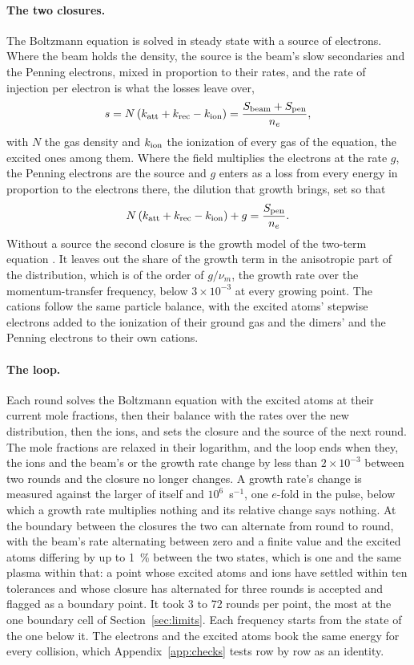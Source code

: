 \documentclass[11pt]{article}
\begin{document}
\paragraph{The two closures.}
The Boltzmann equation is solved in steady state with a source of electrons. Where the beam holds the density, the
source is the beam's slow secondaries and the Penning electrons, mixed in proportion to their rates, and the rate
of injection per electron is what the losses leave over,
\begin{equation}
s=N\left(k_{\rm att}+k_{\rm rec}-k_{\rm ion}\right)=\frac{S_{\rm beam}+S_{\rm pen}}{n_e},
\label{eq:held}
\end{equation}
with $N$ the gas density and $k_{\rm ion}$ the ionization of every gas of the equation, the excited ones among
them. Where the field multiplies the electrons at the rate $g$, the Penning electrons are the source and $g$ enters
as a loss from every energy in proportion to the electrons there, the dilution that growth brings, set so that
\begin{equation}
N\left(k_{\rm att}+k_{\rm rec}-k_{\rm ion}\right)+g=\frac{S_{\rm pen}}{n_e}.
\label{eq:grow}
\end{equation}
Without a source the second closure is the growth model of the two-term equation \cite{HP2005}. It leaves out the
share of the growth term in the anisotropic part of the distribution, which is of the order of $g/\nu_m$, the
growth rate over the momentum-transfer frequency, below $3\times10^{-3}$ at every growing point. The cations
follow the same particle balance, with the excited atoms' stepwise electrons added to the ionization of their
ground gas and the dimers' and the Penning electrons to their own cations.

\paragraph{The loop.}
Each round solves the Boltzmann equation with the excited atoms at their current mole fractions, then their
balance with the rates over the new distribution, then the ions, and sets the closure and the source of the next
round. The mole fractions are relaxed in their logarithm, and the loop ends when they, the ions and the beam's or
the growth rate change by less than $2\times10^{-3}$ between two rounds and the closure no longer changes. A
growth rate's change is measured against the larger of itself and $10^6$~s$^{-1}$, one $e$-fold in the pulse,
below which a growth rate multiplies nothing and its relative change says nothing. At the boundary between the
closures the two can alternate from round to round, with the beam's rate alternating between zero and a finite
value and the excited atoms differing by up to 1~\% between the two states, which is one and the same plasma within
that: a point whose excited atoms and ions have settled within ten tolerances and whose closure has alternated
for three rounds is accepted and flagged as a boundary point. It took 3 to 72 rounds per point, the most at the
one boundary cell of Section~\ref{sec:limits}. Each frequency starts from the state of the one below it. The
electrons and the excited atoms book the same energy for every collision, which Appendix~\ref{app:checks} tests
row by row as an identity.
\end{document}
